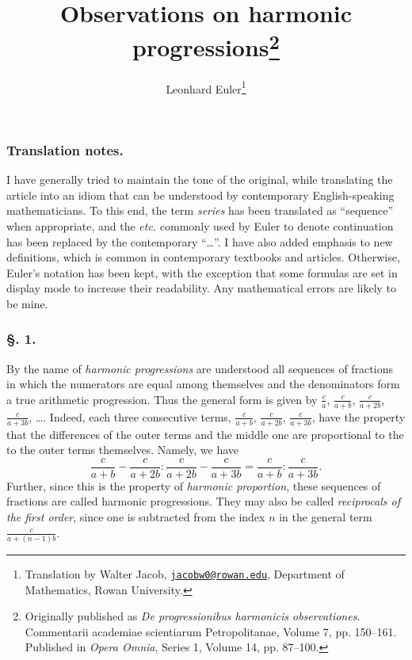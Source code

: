 \documentclass[12pt, letterpaper]{article}
\begin{document}
\title{Observations on harmonic progressions\footnote{Originally published as \emph{De progressionibus harmonicis observationes.} Commentarii academiae scientiarum Petropolitanae, Volume 7, pp. 150--161. Published in \emph{Opera Omnia}, Series 1, Volume 14, pp. 87--100.}}
\author{Leonhard Euler\footnote{Translation by Walter Jacob, \href{jacobw0@rowan.edu}{\nolinkurl{jacobw0@rowan.edu}}, Department of Mathematics, Rowan University.}}
\date{}
\maketitle

\subsubsection*{Translation notes.}
I have generally tried to maintain the tone of the original, while
translating the article into an idiom that can be understood by contemporary
English-speaking mathematicians. To this end, the term \emph{series} has been
translated as ``sequence'' when appropriate, and the \emph{etc.} commonly used
by Euler to denote continuation has been replaced by the contemporary ``\ldots''.
I have also added emphasis to new definitions, which is common in contemporary
textbooks and articles.
Otherwise, Euler's notation has been kept, with the exception that some
formulas are set in display mode to increase their readability. Any mathematical
errors are likely to be mine.

\subsubsection*{\S. 1.}
By the name of \emph{harmonic progressions} are understood all sequences of
fractions in which the numerators are equal among themselves and the
denominators form a true arithmetic progression.
Thus the general form is given by
$\frac{c}{a}$, $\frac{c}{a+b}$, $\frac{c}{a+2b}$, $\frac{c}{a+3b}$, \ldots.
Indeed, each three consecutive terms,
$\frac{c}{a+b}$, $\frac{c}{a+2b}$, $\frac{c}{a+3b}$,
have the property that the differences of the outer terms and the middle one
are proportional to the to the outer terms themselves. Namely, we have
\[
    \frac{c}{a+b} - \frac{c}{a+2b} : \frac{c}{a+2b} - \frac{c}{a+3b} = \frac{c}{a+b} : \frac{c}{a+3b}.
\]
Further, since this is the property of \emph{harmonic proportion}, these
sequences of fractions are called harmonic progressions.
They may also be called \emph{reciprocals of the first order}, since one is
subtracted from the index $n$ in the general term $\frac{c}{a+(n-1)b}$.
\end{document}
